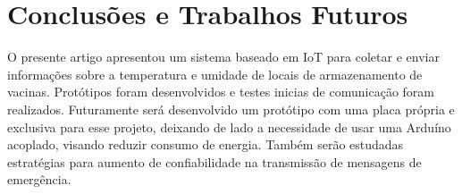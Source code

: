 \section{Conclusões e Trabalhos Futuros}

    O presente artigo apresentou um sistema baseado em IoT para coletar e enviar informações sobre a temperatura e umidade de locais de armazenamento de vacinas. Protótipos foram desenvolvidos e testes inicias de comunicação foram realizados.%
    Futuramente será desenvolvido um protótipo com uma placa própria e exclusiva para esse projeto, deixando de lado a necessidade de usar uma Arduíno acoplado, visando reduzir consumo de energia. Também serão estudadas estratégias para aumento de confiabilidade na transmissão de mensagens de emergência.%